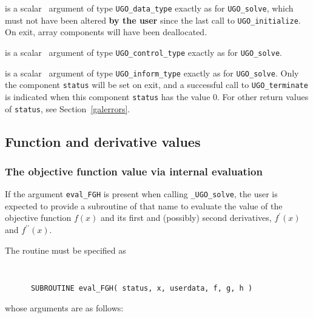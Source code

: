 \documentclass{galahad}
\newcommand{\packagename}{UGO}
\newcommand{\fullpackagename}{\libraryname\_\packagename}
\newcommand{\solver}{{\tt \fullpackagename\_solve}}
\begin{document}
\vspace*{-1mm}
\begin{description}

 is a scalar \intentinout\ argument of type
{\tt \packagename\_data\_type}
exactly as for
{\tt \packagename\_solve},
which must not have been altered {\bf by the user} since the last call to
{\tt \packagename\_initialize}.
On exit, array components will have been deallocated.

 is a scalar \intentin\ argument of type
{\tt \packagename\_control\_type}
exactly as for
{\tt \packagename\_solve}.

 is a scalar \intentout\ argument of type
{\tt \packagename\_inform\_type}
exactly as for
{\tt \packagename\_solve}.
Only the component {\tt status} will be set on exit, and a
successful call to
{\tt \packagename\_terminate}
is indicated when this  component {\tt status} has the value 0.
For other return values of {\tt status}, see Section~\ref{galerrors}.

\end{description}


\subsection{Function and derivative values\label{fdv}}


\subsubsection{The objective function value via internal evaluation\label{fghfv}}

If the argument {\tt eval\_FGH} is present when calling \solver, the
user is expected to provide a subroutine of that name to evaluate the
value of the objective function $f(x)$ and its first and (possibly)
second derivatives, $f^{\prime}(x)$ and $f^{\prime\prime}(x)$.

The routine must be specified as

\def\baselinestretch{0.8}
{\tt
\begin{verbatim}
      SUBROUTINE eval_FGH( status, x, userdata, f, g, h )
\end{verbatim}
}
\def\baselinestretch{1.0}
\noindent whose arguments are as follows:
\end{document}

